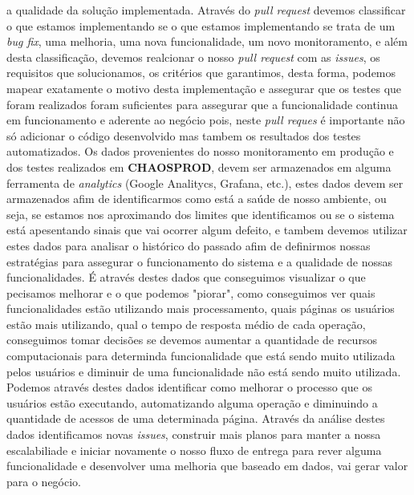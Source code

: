         a qualidade da solução implementada. Através do \textit{pull request}
        devemos classificar o que estamos implementando se o que estamos implementando
        se trata de um \textit{bug fix}, uma melhoria, uma nova funcionalidade,
        um novo monitoramento, e além desta classificação, devemos realcionar
        o nosso \textit{pull request} com as \textit{issues}, os requisitos que
        solucionamos, os critérios que garantimos, desta forma, podemos mapear
        exatamente o motivo desta implementação e assegurar que os testes que
        foram realizados foram suficientes para assegurar que a funcionalidade
        continua em funcionamento e aderente ao negócio pois, neste \textit{pull
        reques} é importante não só adicionar o código desenvolvido mas tambem os
        resultados dos testes automatizados. \newline
        Os dados provenientes do nosso monitoramento em produção e dos testes
        realizados em \textbf{CHAOSPROD}, devem ser armazenados em alguma ferramenta
        de \textit{analytics} (Google Analitycs, Grafana, etc.), estes dados
        devem ser armazenados afim de identificarmos como está a saúde de nosso
        ambiente, ou seja, se estamos nos aproximando dos limites que identificamos
        ou se o sistema está apesentando sinais que vai ocorrer algum defeito, e
        tambem devemos utilizar estes dados para analisar o histórico do passado
        afim de definirmos nossas estratégias para assegurar o funcionamento do
        sistema e a qualidade de nossas funcionalidades. É através destes dados
        que conseguimos visualizar o que pecisamos melhorar e o que podemos
        "piorar", como conseguimos ver quais funcionalidades estão utilizando
        mais processamento, quais páginas os usuários estão mais utilizando, qual
        o tempo de resposta médio de cada operação, conseguimos tomar decisões
        se devemos aumentar a quantidade de recursos computacionais para determinda
        funcionalidade que está sendo muito utilizada pelos usuários e diminuir
        de uma funcionalidade não está sendo muito utilizada. Podemos através
        destes dados identificar como melhorar o processo que os usuários estão
        executando, automatizando alguma operação e diminuindo a quantidade de
        acessos de uma determinada página. Através da análise destes dados
        identificamos novas \textit{issues}, construir mais planos para manter
        a nossa escalabiliade e iniciar novamente o nosso fluxo de entrega para
        rever alguma funcionalidade e desenvolver uma melhoria que baseado em
        dados, vai gerar valor para o negócio.

